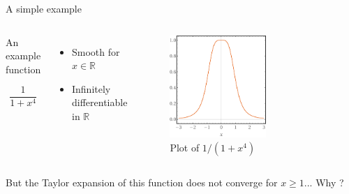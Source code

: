 \documentclass[xcolor=x11names,compress]{beamer}
\renewcommand{\(}{\begin{columns}}
\renewcommand{\)}{\end{columns}}
\newcommand{\<}[1]{\begin{column}{#1}}
\renewcommand{\>}{\end{column}}
\begin{document}
\begin{frame}{A simple example}

\begin{columns}


\begin{beamerboxesrounded}[scheme=foncé]{An example function}

\begin{equation*}
   \frac{1}{1 + x^4}
\end{equation*}

\end{beamerboxesrounded}

\vspace{1cm}

\begin{itemize}
    \item Smooth for $x \in \mathbb{R}$
    
    \item Infinitely differentiable in $\mathbb{R}$
\end{itemize}


    \begin{figure}
    \centering
    \includegraphics[width=0.6\textwidth]{exemplesingu.pdf}
    \caption{Plot of $1/(1+x^4)$}
    \label{fig:my_label}
\end{figure}

\end{columns}

But the Taylor expansion of this function does not converge for $x\geq1$... 
\vspace{0.3cm}
\centering Why ?

\end{frame}
\end{document}
